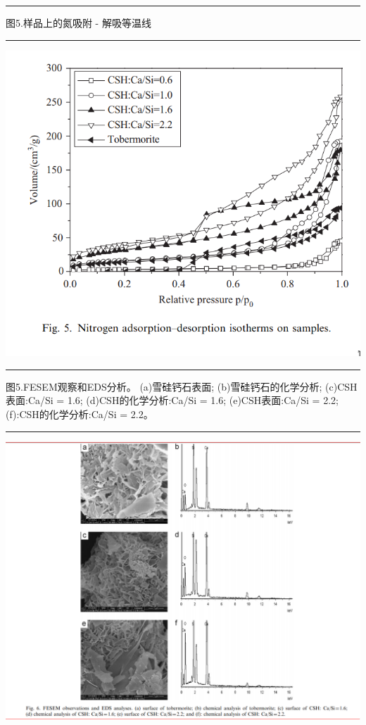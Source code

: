 \documentclass[11pt]{article}
\begin{document}
\noindent\rule{\textwidth}{0.5pt}
图5.样品上的氮吸附 - 解吸等温线

\noindent\rule{\textwidth}{0.5pt}
\includegraphics[scale=0.5]{fig.5.png}

\noindent\rule{\textwidth}{0.5pt}
图5.FESEM观察和EDS分析。 (a)雪硅钙石表面; (b)雪硅钙石的化学分析; (c)CSH表面:Ca/Si = 1.6; (d)CSH的化学分析:Ca/Si = 1.6; (e)CSH表面:Ca/Si = 2.2; (f):CSH的化学分析:Ca/Si = 2.2。

\noindent\rule{\textwidth}{0.5pt}
\includegraphics[scale=0.5]{fig.6.png}
\end{document}
